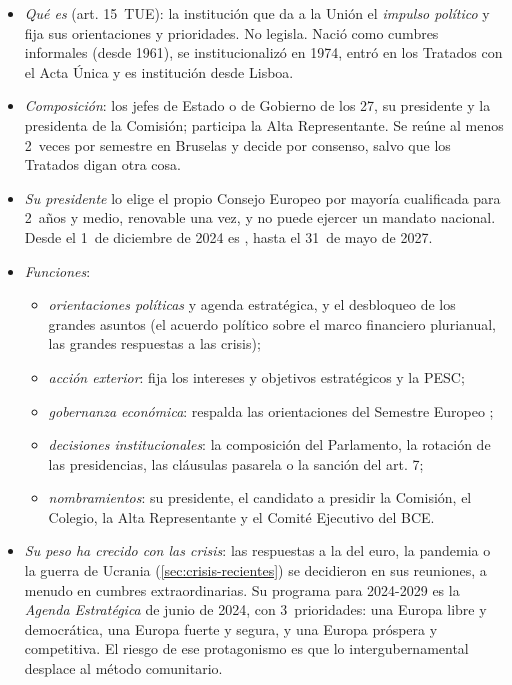 \documentclass[11pt]{article}
\begin{document}
\begin{itemize}
\item \emph{Qué es} (art. 15~TUE): la institución que da a la Unión el \emph{impulso político} y fija sus orientaciones y prioridades. No legisla. Nació como cumbres informales (desde 1961), se institucionalizó en 1974, entró en los Tratados con el Acta Única y es institución desde Lisboa.
\item \emph{Composición}: los jefes de Estado o de Gobierno de los 27, su presidente y la presidenta de la Comisión; participa la Alta Representante. Se reúne al menos 2~veces por semestre en Bruselas y decide por consenso, salvo que los Tratados digan otra cosa.
\item \emph{Su presidente} lo elige el propio Consejo Europeo por mayoría cualificada para 2~años y medio, renovable una vez, y no puede ejercer un mandato nacional. Desde el 1~de diciembre de 2024 es , hasta el 31~de mayo de 2027\nocite{ConsejoEuropeo2024Presidente}.
\item \emph{Funciones}:
  \begin{itemize}
  \item \emph{orientaciones políticas} y agenda estratégica, y el desbloqueo de los grandes asuntos (el acuerdo político sobre el marco financiero plurianual, las grandes respuestas a las crisis);
  \item \emph{acción exterior}: fija los intereses y objetivos estratégicos y la PESC;
  \item \emph{gobernanza económica}: respalda las orientaciones del Semestre Europeo ;
  \item \emph{decisiones institucionales}: la composición del Parlamento, la rotación de las presidencias, las cláusulas pasarela o la sanción del art. 7;
  \item \emph{nombramientos}: su presidente, el candidato a presidir la Comisión, el Colegio, la Alta Representante y el Comité Ejecutivo del BCE.
  \end{itemize}
\item \emph{Su peso ha crecido con las crisis}: las respuestas a la del euro, la pandemia o la guerra de Ucrania (\ref{sec:crisis-recientes}) se decidieron en sus reuniones, a menudo en cumbres extraordinarias. Su programa para 2024-2029 es la \emph{Agenda Estratégica} de junio de 2024, con 3~prioridades: una Europa libre y democrática, una Europa fuerte y segura, y una Europa próspera y competitiva\nocite{ConsejoEuropeo2024Presidente}. El riesgo de ese protagonismo es que lo intergubernamental desplace al método comunitario.
\end{itemize}
\end{document}
